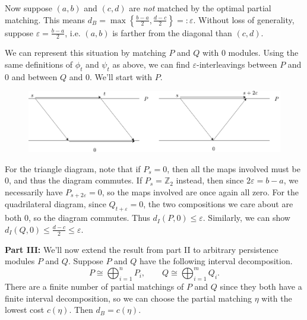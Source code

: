 \documentclass[twoside,10pt]{article}
\begin{document}
Now suppose $(a,b)$ and $(c,d)$ are \textit{not} matched by the optimal partial matching. This means $d_{B} = \max \left\{ \frac{b-a}{2} ,\frac{d-c}{2}  \right\} =: \varepsilon$. Without loss of generality, suppose $\varepsilon = \frac{b-a}{2} $, i.e. $(a,b)$ is farther from the diagonal than $(c,d)$.

We can represent this situation by matching $P$ and $Q$ with 0 modules. Using the same definitions of $\phi_t$ and $\psi_t$ as above, we can find $\varepsilon$-interleavings between $P$ and $0$ and between $Q$ and 0. We'll start with $P$.

\begin{figure}[H]
	\centering
	\includegraphics[scale=0.6]{fig/2c.pdf}
\end{figure}

For the triangle diagram, note that if $P_s=0$, then all the maps involved must be 0, and thus the diagram commutes. If $P_s = \mathbb{Z}_2$ instead, then since $2\varepsilon = b-a$, we necessarily have $P_{s+2\varepsilon}=0$, so the maps involved are once again all zero. For the quadrilateral diagram, since $Q_{t+\varepsilon}=0$, the two compositions we care about are both 0, so the diagram commutes. Thus $d_I(P,0) \leq \varepsilon$. Similarly, we can show $d_I(Q,0) \leq \frac{d-c}{2} \leq \varepsilon$.

\textbf{Part III:} We'll now extend the result from part II to arbitrary persistence modules $P$ and $Q$. Suppose $P$ and $Q$ have the following interval decomposition.
\[
	P \cong \bigoplus_{i=1}^{n} P_i, \qquad Q \cong \bigoplus_{i=1}^{m} Q_i.
\]
There are a finite number of partial matchings of $P$ and $Q$ since they both have a finite interval decomposition, so we can choose the partial matching $\eta$ with the lowest cost $c(\eta)$. Then $d_B = c(\eta)$.
\end{document}
